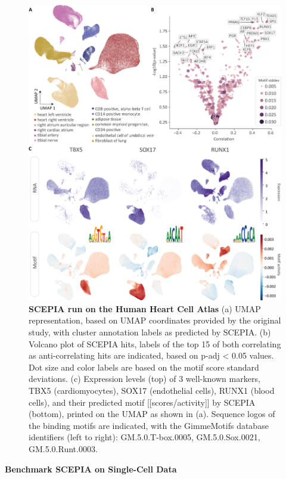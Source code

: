 \begin{figure}
    \centering
    \includegraphics[width=0.75\linewidth]{ch.scepia/imgs/SCEPIA_allCells_Fig1_v9.png}
    \caption{\textbf{SCEPIA run on the Human Heart Cell Atlas} (a) UMAP representation, based on UMAP coordinates provided by the original study\cite{Kanemaru2023}, with cluster annotation labels as predicted by SCEPIA. (b) Volcano plot of SCEPIA hits, labels of the top 15 of both correlating as anti-correlating hits are indicated, based on p-adj < 0.05 values. Dot size and color labels are based on the motif score standard deviations.  (c) Expression levels (top) of 3 well-known markers, TBX5 (cardiomyocytes), SOX17 (endothelial cells), RUNX1 (blood cells), and their predicted motif [[scores/activity]] by SCEPIA (bottom), printed on the UMAP as shown in (a). Sequence logos of the binding motifs are indicated, with the GimmeMotifs database identifiers (left to right): GM.5.0.T-box.0005, GM.5.0.Sox.0021, GM.5.0.Runt.0003. }
    \label{fig:scepia_hhca1}
\end{figure}

\textbf{Benchmark SCEPIA on Single-Cell Data}

